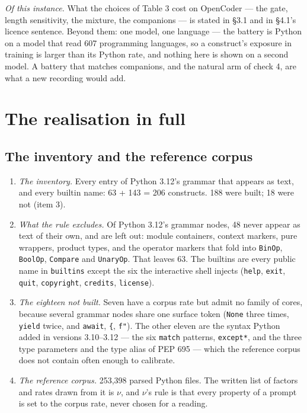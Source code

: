 \documentclass{article}
\begin{document}
\emph{Of this instance.} What the choices of Table 3 cost on OpenCoder --- the gate, length sensitivity, the mixture, the companions --- is stated in \S3.1 and in \S4.1's licence sentence. Beyond them: one model, one language --- the battery is Python on a model that read 607 programming languages, so a construct's exposure in training is larger than its Python rate, and nothing here is shown on a second model. A battery that matches companions, and the natural arm of check 4, are what a new recording would add.



\appendix
\section{The realisation in full}

\subsection{The inventory and the reference corpus}

\begin{enumerate}[topsep=2pt,itemsep=1pt,parsep=0pt,partopsep=0pt,leftmargin=*]
\item \emph{The inventory.} Every entry of Python 3.12's grammar that appears as text, and every builtin name: 63 + 143 = 206 constructs. 188 were built; 18 were not (item 3).
\item \emph{What the rule excludes.} Of Python 3.12's grammar nodes, 48 never appear as text of their own, and are left out: module containers, context markers, pure wrappers, product types, and the operator markers that fold into \texttt{BinOp}, \texttt{BoolOp}, \texttt{Compare} and \texttt{UnaryOp}. That leaves 63. The builtins are every public name in \texttt{builtins} except the six the interactive shell injects (\texttt{help}, \texttt{exit}, \texttt{quit}, \texttt{copyright}, \texttt{credits}, \texttt{license}).
\item \emph{The eighteen not built.} Seven have a corpus rate but admit no family of cores, because several grammar nodes share one surface token (\texttt{None} three times, \texttt{yield} twice, and \texttt{await}, \texttt{\{}, \texttt{f"}). The other eleven are the syntax Python added in versions 3.10--3.12 --- the six \texttt{match} patterns, \texttt{except*}, and the three type parameters and the type alias of PEP 695 --- which the reference corpus does not contain often enough to calibrate.
\item \emph{The reference corpus.} 253,398 parsed Python files. The written list of factors and rates drawn from it is $\nu$, and $\nu$'s rule is that every property of a prompt is set to the corpus rate, never chosen for a reading.
\end{enumerate}
\end{document}

